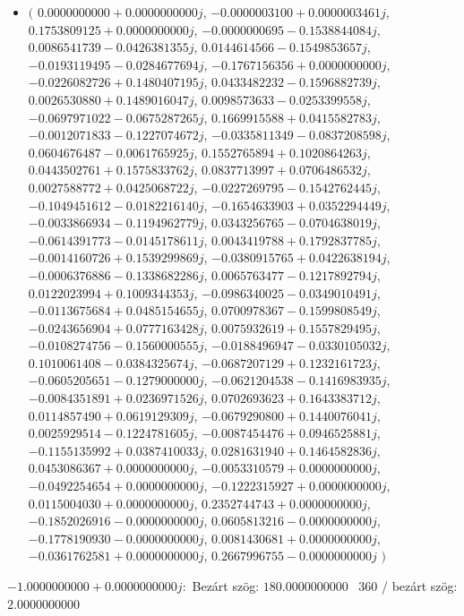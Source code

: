 \documentclass[14pt,a4paper]{article}
\begin{document}
\begin{itemize}
\item
$\big($
$0.0000000000+0.0000000000j$, $-0.0000003100+0.0000003461j$, $0.1753809125+0.0000000000j$, $-0.0000000695-0.1538844084j$, $0.0086541739-0.0426381355j$, $0.0144614566-0.1549853657j$, $-0.0193119495-0.0284677694j$, $-0.1767156356+0.0000000000j$, $-0.0226082726+0.1480407195j$, $0.0433482232-0.1596882739j$, $0.0026530880+0.1489016047j$, $0.0098573633-0.0253399558j$, $-0.0697971022-0.0675287265j$, $0.1669915588+0.0415582783j$, $-0.0012071833-0.1227074672j$, $-0.0335811349-0.0837208598j$, $0.0604676487-0.0061765925j$, $0.1552765894+0.1020864263j$, $0.0443502761+0.1575833762j$, $0.0837713997+0.0706486532j$, $0.0027588772+0.0425068722j$, $-0.0227269795-0.1542762445j$, $-0.1049451612-0.0182216140j$, $-0.1654633903+0.0352294449j$, $-0.0033866934-0.1194962779j$, $0.0343256765-0.0704638019j$, $-0.0614391773-0.0145178611j$, $0.0043419788+0.1792837785j$, $-0.0014160726+0.1539299869j$, $-0.0380915765+0.0422638194j$, $-0.0006376886-0.1338682286j$, $0.0065763477-0.1217892794j$, $0.0122023994+0.1009344353j$, $-0.0986340025-0.0349010491j$, $-0.0113675684+0.0485154655j$, $0.0700978367-0.1599808549j$, $-0.0243656904+0.0777163428j$, $0.0075932619+0.1557829495j$, $-0.0108274756-0.1560000555j$, $-0.0188496947-0.0330105032j$, $0.1010061408-0.0384325674j$, $-0.0687207129+0.1232161723j$, $-0.0605205651-0.1279000000j$, $-0.0621204538-0.1416983935j$, $-0.0084351891+0.0236971526j$, $0.0702693623+0.1643383712j$, $0.0114857490+0.0619129309j$, $-0.0679290800+0.1440076041j$, $0.0025929514-0.1224781605j$, $-0.0087454476+0.0946525881j$, $-0.1155135992+0.0387410033j$, $0.0281631940+0.1464582836j$, $0.0453086367+0.0000000000j$, $-0.0053310579+0.0000000000j$, $-0.0492254654+0.0000000000j$, $-0.1222315927+0.0000000000j$, $0.0115004030+0.0000000000j$, $0.2352744743+0.0000000000j$, $-0.1852026916-0.0000000000j$, $0.0605813216-0.0000000000j$, $-0.1778190930-0.0000000000j$, $0.0081430681+0.0000000000j$, $-0.0361762581+0.0000000000j$, $0.2667996755-0.0000000000j$
$\big)$
\end{itemize}
$-1.0000000000+0.0000000000j$:\
Bezárt szög: $180.0000000000$ \
360 / bezárt szög: $2.0000000000$\
\end{document}
